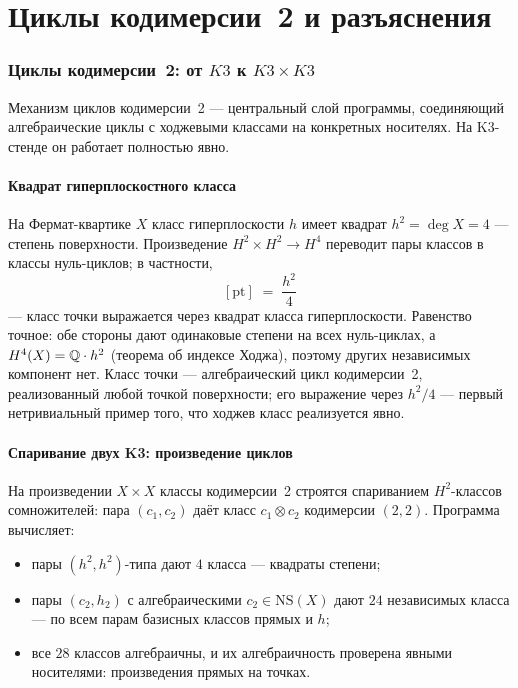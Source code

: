 \part{Циклы кодимерсии~2 и разъяснения}

\section{Циклы кодимерсии~2: от $K3$ к $K3\times K3$}\label{sec:codim2}

Механизм циклов кодимерсии~2 --- центральный слой программы,
соединяющий алгебраические циклы с ходжевыми классами на конкретных
носителях. На K3-стенде он работает полностью явно.

\subsection{Квадрат гиперплоскостного класса}

На Фермат-квартике $X$ класс гиперплоскости $h$ имеет квадрат
$h^2=\deg X=4$ --- степень поверхности. Произведение
$H^2\times H^2\to H^4$ переводит пары классов в классы нуль-циклов;
в частности,
\[
  [\mathrm{pt}] \;=\; \frac{h^2}{4}
\]
--- класс точки выражается через квадрат класса гиперплоскости.
Равенство точное: обе стороны дают одинаковые степени на всех
нуль-циклах, а $H^4(X)=\mathbb{Q}\cdot h^2$ (теорема об индексе Ходжа),
поэтому других независимых компонент нет. Класс точки ---
алгебраический цикл кодимерсии~2, реализованный любой точкой
поверхности; его выражение через $h^2/4$ --- первый нетривиальный
пример того, что ходжев класс реализуется явно.

\subsection{Спаривание двух K3: произведение циклов}

На произведении $X\times X$ классы кодимерсии~2 строятся
спариванием $H^2$-классов сомножителей: пара $(c_1,c_2)$ даёт класс
$c_1\otimes c_2$ кодимерсии $(2,2)$. Программа вычисляет:
\begin{itemize}[leftmargin=1.6em, itemsep=0.1em]
\item пары $(h^2, h^2)$-типа дают $4$ класса --- квадраты степени;
\item пары $(c_2,h_2)$ с алгебраическими $c_2\in\mathrm{NS}(X)$
  дают $24$ независимых класса --- по всем парам базисных классов
  прямых и $h$;
\item все $28$ классов алгебраичны, и их алгебраичность проверена
  явными носителями: произведения прямых на точках.
\end{itemize}

